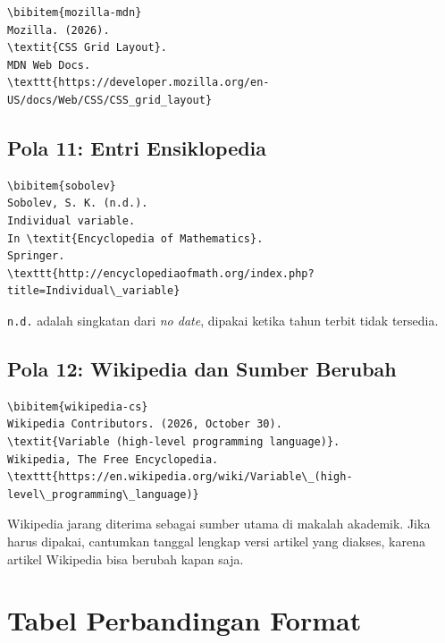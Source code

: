 \documentclass[11pt,a4paper]{article}
\begin{document}
\begin{lstlisting}[style=code]
\bibitem{mozilla-mdn}
Mozilla. (2026).
\textit{CSS Grid Layout}.
MDN Web Docs.
\texttt{https://developer.mozilla.org/en-US/docs/Web/CSS/CSS_grid_layout}
\end{lstlisting}

\subsection{Pola 11: Entri Ensiklopedia}

\begin{lstlisting}[style=code]
\bibitem{sobolev}
Sobolev, S. K. (n.d.).
Individual variable.
In \textit{Encyclopedia of Mathematics}.
Springer.
\texttt{http://encyclopediaofmath.org/index.php?title=Individual\_variable}
\end{lstlisting}

\texttt{n.d.} adalah singkatan dari \textit{no date}, dipakai ketika tahun terbit tidak tersedia.

\subsection{Pola 12: Wikipedia dan Sumber Berubah}

\begin{lstlisting}[style=code]
\bibitem{wikipedia-cs}
Wikipedia Contributors. (2026, October 30).
\textit{Variable (high-level programming language)}.
Wikipedia, The Free Encyclopedia.
\texttt{https://en.wikipedia.org/wiki/Variable\_(high-level\_programming\_language)}
\end{lstlisting}

Wikipedia jarang diterima sebagai sumber utama di makalah akademik. Jika harus dipakai, cantumkan tanggal lengkap versi artikel yang diakses, karena artikel Wikipedia bisa berubah kapan saja.

\section{Tabel Perbandingan Format}
\end{document}
